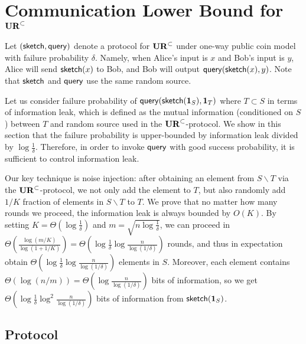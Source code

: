 \section{Communication Lower Bound for $\mathbf{UR}^\subset$} \label{sec:optimal-lb}


Let $(\mathsf{sketch}, \mathsf{query})$ denote a protocol for $\mathbf{UR}^\subset$ under one-way public coin model with failure probability $\delta$.
Namely, when Alice's input is $x$ and Bob's input is $y$, Alice will send $\mathsf{sketch}(x)$ to Bob, and Bob will output $\mathsf{query}(\mathsf{sketch}(x), y)$. 
Note that $\mathsf{sketch}$ and $\mathsf{query}$ use the same random source. 

Let us consider failure probability of $\mathsf{query}(\mathsf{sketch}(\mathbf{1}_S), \mathbf{1}_T)$ where $T\subset S$ in terms of information leak, which is defined as the mutual information (conditioned on $S$) between $T$ and random source used in the $\mathbf{UR}^\subset$-protocol. 
We show in this section that the failure probability is upper-bounded by information leak divided by $\log \frac{1}{\delta}$. 
Therefore, in order to invoke $\mathsf{query}$ with good success probability, it is sufficient to control information leak.

Our key technique is noise injection: after obtaining an element from $S\backslash T$ via the $\mathbf{UR}^\subset$-protocol, we not only add the element to $T$, but also randomly add $1/K$ fraction of elements in $S\backslash T$ to $T$. 
We prove that no matter how many rounds we proceed, the information leak is always bounded by $O(K)$. 
By setting $K=\Theta(\log \frac{1}{\delta})$ and $m=\sqrt{n\log\frac{1}{\delta}}$, we can proceed in $\Theta(\frac{\log (m/K)}{\log (1 +1/K)}) = \Theta(\log\frac{1}{\delta}\log\frac{n}{\log(1/\delta)})$ rounds, and thus in expectation obtain $\Theta(\log\frac{1}{\delta}\log\frac{n}{\log(1/\delta)})$ elements in $S$.
Moreover, each element contains $\Theta(\log(n/m))=\Theta(\log \frac{n}{\log (1/\delta)})$ bits of information, so we get $\Theta(\log \frac{1}{\delta}\log^2 \frac{n}{\log (1/\delta)}) $ bits of information from $\mathsf{sketch}(\mathbf{1}_S)$. 

\subsection{Protocol}

